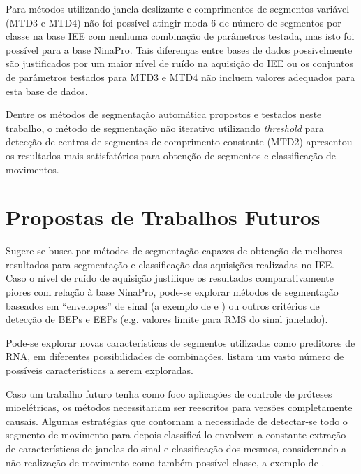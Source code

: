 Para métodos utilizando janela deslizante e comprimentos de segmentos variável (MTD3 e MTD4) não foi possível atingir moda 6 de número de segmentos por classe na base IEE com nenhuma combinação de parâmetros testada, mas isto foi possível para a base NinaPro. Tais diferenças entre bases de dados possivelmente são justificados por um maior nível de ruído na aquisição do IEE ou os conjuntos de parâmetros testados para MTD3 e MTD4 não incluem valores adequados para esta base de dados.

Dentre os métodos de segmentação automática propostos e testados neste trabalho, o método de segmentação não iterativo utilizando \emph{threshold} para detecção de centros de segmentos de comprimento constante (MTD2) apresentou os resultados mais satisfatórios para obtenção de segmentos e classificação de movimentos.


	\chapter{Propostas de Trabalhos Futuros}
Sugere-se busca por métodos de segmentação capazes de obtenção de melhores resultados para segmentação e classificação das aquisições realizadas no IEE. Caso o nível de ruído de aquisição justifique os resultados comparativamente piores com relação à base NinaPro, pode-se explorar métodos de segmentação baseados em ``envelopes'' de sinal (a exemplo de  e ) ou outros critérios de detecção de BEPs e EEPs (e.g. valores limite para RMS do sinal janelado).

Pode-se explorar novas características de segmentos utilizadas como preditores de RNA, em diferentes possibilidades de combinações.  listam um vasto número de possíveis características a serem exploradas.

Caso um trabalho futuro tenha como foco aplicações de controle de próteses mioelétricas, os métodos necessitariam ser reescritos para versões completamente causais. Algumas estratégias que contornam a necessidade de detectar-se todo o segmento de movimento para depois classificá-lo envolvem a constante extração de características de janelas do sinal e classificação dos mesmos, considerando a não-realização de movimento como também possível classe, a exemplo de .


